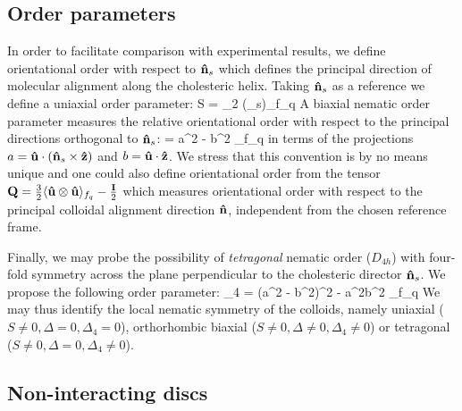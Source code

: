 \subsection{Order parameters}

In order to facilitate comparison with experimental results, we define orientational order  with respect to  ${\bf \hat{n}}_{s}$ which defines the principal direction of molecular alignment along the cholesteric helix. Taking ${\bf \hat{n}}_{s}$ as a reference we define a uniaxial order parameter:
\beq
S = _{2} (\bhu \cdot \bn_{s})\rangle_{f_{q}}
\label{s2}
\eeq
A biaxial nematic order parameter measures the relative orientational order with respect to the principal directions orthogonal to ${\bf \hat{n}}_{s}$:
\beq
\Delta = \langle a^{2} - b^{2} \rangle_{f_{q}}
\label{d2}
\eeq
in terms of the projections $a= {\bf \hat{u}} \cdot ({\bf \hat{n}}_{s} \times {\bf \hat{z}})$ and $b = {\bf \hat{u}} \cdot {\bf \hat{z}}$.
We stress that this convention is by no means unique and one could also define orientational order from the tensor ${\bf Q} =  \frac{3}{2} \langle {\bf \hat{u}} \otimes {\bf \hat{u}}  \rangle_{f_{q}} - \frac{{\bf I}}{2} $ which measures orientational order with respect to the principal colloidal alignment direction ${\bf \hat{n}}$, independent from the chosen reference frame.

Finally, we may probe the possibility of {\em tetragonal} nematic order ($D_{4h}$) with four-fold symmetry across the plane perpendicular to the cholesteric director ${\bf \hat{n}}_{s}$. We propose the following order parameter:
\beq
\Delta_{4} = \langle (a^{2} - b^{2})^{2} - a^{2}b^{2} \rangle_{f_{q}}
\eeq
We may thus identify the local nematic symmetry of the colloids, namely  uniaxial  ($S \neq 0, \Delta = 0, \Delta_{4} =0$),  orthorhombic biaxial ($S \neq 0, \Delta \neq 0, \Delta_{4} \neq 0$) or tetragonal  ($S \neq 0, \Delta = 0, \Delta_{4} \neq 0$).



\subsection{Non-interacting discs}

